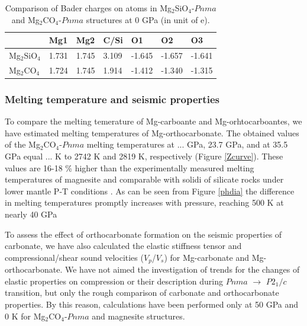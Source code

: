 \documentclass[a4paperm]{article}
\begin{document}
\begin{table}[h] \centering
	\caption{Comparison of Bader charges on atoms in Mg$_2$SiO$_4$-$Pnma$ and Mg$_2$CO$_4$-$Pnma$ structures at 0 GPa (in unit of e).} \vspace{2mm} \label{t:bader}
	\begin{tabular}{l l l l l l l }
        &       Mg1     &       Mg2     &       C/Si    &       O1      &       O2      &       O3      \\
		\hline
Mg$_2$SiO$_4$ &       1.731   &       1.745   &       3.109   &       -1.645  &       -1.657  &       -1.641  \\
Mg$_2$CO$_4$  &       1.724   &       1.745   &       1.914   &       -1.412  &       -1.340  &       -1.315  \\
		\hline 


	\end{tabular}
\end{table}


\subsubsection*{Melting temperature and seismic properties}
To compare the melting temerature of Mg-carboante and Mg-orhtocarboantes, we have estimated melting temperatures of Mg-orthocarbonate.
The obtained values of the Mg$_2$CO$_4$-$Pnma$ melting temperatures at ... GPa, 23.7 GPa, and at 35.5 GPa equal ... K to 2742 K and 2819 K, respectively (Figure \ref{Zcurve}).
These values are 16-18 \% higher than the experimentally measured melting temperatures of magnesite  and comparable with solidi of silicate rocks under lower mantle P-T conditions \cite{litasov2018_review}.
As can be seen from Figure \ref{phdia} the difference in melting temperatures promptly increases with pressure, reaching 500 K at nearly 40 GPa



To assess the effect of orthocarbonate formation on the seismic properties of carbonate, we have also calculated the elastic stiffness tensor and compressional/shear sound velocities ($V_p$/$V_s$) for Mg-carbonate and Mg-orthocarbonate.
We have not aimed the investigation of trends for the changes of elastic properties on compression or their description during $Pnma$ $\to$ $P2_1/c$ transition, but only the rough comparison of carbonate and orthocarbonate properties.
By this reason, calculations have been performed only at 50 GPa and 0 K for Mg$_2$CO$_4$-$Pnma$ and magnesite structures.
\end{document}
